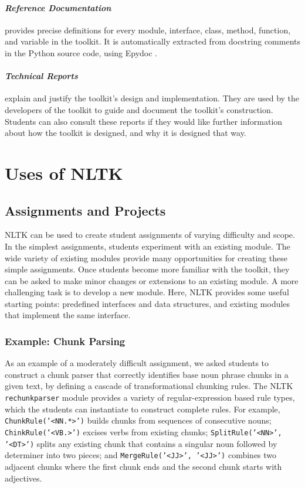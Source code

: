 \documentclass[11pt]{article}
\begin{document}
\paragraph{\textit{Reference Documentation}} provides precise
definitions for every module, interface, class, method, function, and
variable in the toolkit.  It is automatically extracted from docstring
comments in the Python source code, using Epydoc \cite{epydoc}.

\paragraph{\textit{Technical Reports}} explain and justify the
toolkit's design and implementation.  They are used by the developers
of the toolkit to guide and document the toolkit's construction.
Students can also consult these reports if they would like further
information about how the toolkit is designed, and why it is designed
that way.

\section{Uses of NLTK}
\label{sec:uses}

\subsection{Assignments and Projects}

NLTK can be used to create student assignments of varying difficulty
and scope.  
In the simplest assignments, students experiment with an existing
module.  The wide variety of existing modules provide many opportunities
for creating these simple assignments.
Once students become more familiar with the toolkit, they can be asked
to make minor changes or extensions to an existing module.
A more challenging task is to develop a new module.  Here, NLTK
provides some useful starting points: predefined interfaces and data
structures, and existing modules that implement the same interface.

\subsubsection*{Example: Chunk Parsing}

As an example of a moderately difficult assignment, we asked students
to construct a chunk parser that correctly identifies base noun phrase
chunks in a given text, by defining a cascade of transformational
chunking rules.  The NLTK \texttt{rechunkparser} module provides a
variety of regular-expression based rule types, which the students can
instantiate to construct complete rules.  For example,
\texttt{ChunkRule('<NN.*>')} builds chunks from sequences of
consecutive nouns; \texttt{ChinkRule('<VB.>')} excises verbs from
existing chunks; \texttt{SplitRule('<NN>', '<DT>')} splits any
existing chunk that contains a singular noun followed by determiner
into two pieces; and \texttt{MergeRule('<JJ>', '<JJ>')} combines two
adjacent chunks where the first chunk ends and the second chunk starts
with adjectives.
\end{document}
